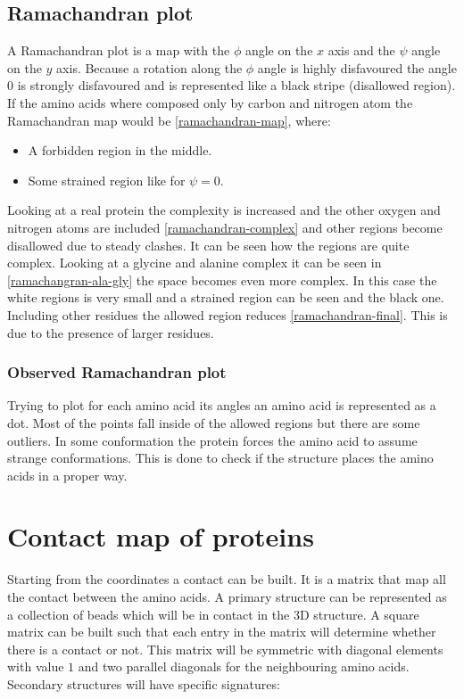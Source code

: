 	\subsection{Ramachandran plot}
	A Ramachandran plot is a map with the $\phi$ angle on the $x$ axis and the $\psi$ angle on the $y$ axis.
	Because a rotation along the $\phi$ angle is highly disfavoured the angle $0$ is strongly disfavoured and is represented like a black stripe (disallowed region).
	If the amino acids where composed only by carbon and nitrogen atom the Ramachandran map would be \ref{ramachandran-map}, where:

	\begin{multicols}{2}
		\begin{itemize}
			\item A forbidden region in the middle.
			\item Some strained region like for $\psi=0$.
		\end{itemize}
	\end{multicols}

	Looking at a real protein the complexity is increased and the other oxygen and nitrogen atoms are included \ref{ramachandran-complex} and other regions become disallowed due to steady clashes.
	It can be seen how the regions are quite complex.
	Looking at a glycine and alanine complex it can be seen in \ref{ramachangran-ala-gly} the space becomes even more complex.
	In this case the white regions is very small and a strained region can be seen and the black one.
	Including other residues the allowed region reduces \ref{ramachandran-final}.
	This is due to the presence of larger residues.

		\subsubsection{Observed Ramachandran plot}
		Trying to plot for each amino acid its angles an amino acid is represented as a dot.
		Most of the points fall inside of the allowed regions but there are some outliers.
		In some conformation the protein forces the amino acid to assume strange conformations.
		This is done to check if the structure places the amino acids in a proper way.

\section{Contact map of proteins}
Starting from the coordinates a contact can be built.
It is a matrix that map all the contact between the amino acids.
A primary structure can be represented as a collection of beads which will be in contact in the 3D structure.
A square matrix can be built such that each entry in the matrix will determine whether there is a contact or not.
This matrix will be symmetric with diagonal elements with value $1$ and two parallel diagonals for the neighbouring amino acids.
Secondary structures will have specific signatures:

